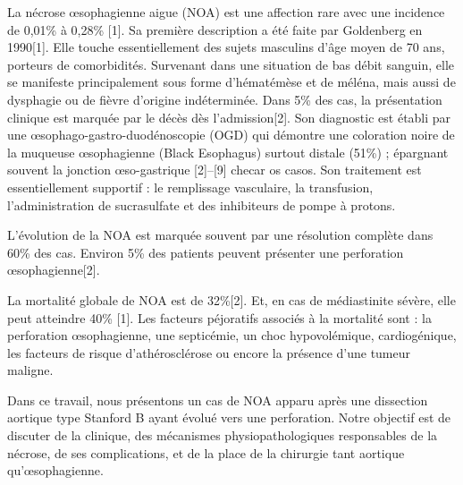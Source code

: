 \documentclass[./tfe.tex]{subfiles}
\begin{document}
La nécrose œsophagienne aigue (NOA) est une affection rare avec une incidence de 0,01\% à 0,28\% [1]. Sa première description a été faite par Goldenberg en 1990[1]. Elle touche essentiellement des sujets masculins d’âge moyen de 70 ans, porteurs de comorbidités. Survenant dans une situation de bas débit sanguin, elle se manifeste principalement sous forme d'hématémèse et de méléna, mais aussi de dysphagie ou de fièvre d'origine indéterminée. Dans 5\% des cas, la présentation clinique est marquée par le décès dès l’admission[2]. Son diagnostic est établi par une œsophago-gastro-duodénoscopie (OGD) qui démontre une coloration noire de la muqueuse œsophagienne (Black Esophagus) surtout distale (51\%) ; épargnant souvent la jonction œso-gastrique [2]–[9] checar os casos. Son traitement est essentiellement supportif : le remplissage vasculaire, la transfusion, l’administration de sucrasulfate et des inhibiteurs de pompe à protons.

L’évolution de la NOA est marquée souvent par une résolution complète dans 60\% des cas. Environ 5\% des patients peuvent présenter une perforation œsophagienne[2].

La mortalité globale de NOA est de 32\%[2]. Et, en cas de médiastinite sévère, elle peut atteindre 40\% [1]. Les facteurs péjoratifs associés à la mortalité sont : la perforation œsophagienne, une septicémie, un choc hypovolémique, cardiogénique, les facteurs de risque d’athérosclérose ou encore la présence d’une tumeur maligne.

Dans ce travail, nous présentons un cas de NOA apparu après une dissection aortique type Stanford B ayant évolué vers une perforation. Notre objectif est de discuter de la clinique, des mécanismes physiopathologiques responsables de la nécrose, de ses complications, et de la place de la chirurgie tant aortique qu’œsophagienne.
\end{document}
